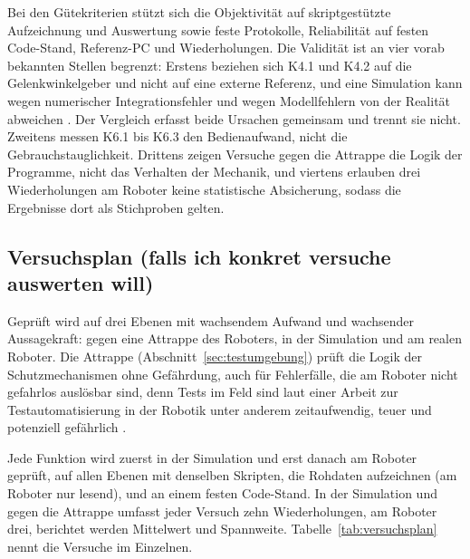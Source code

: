 Bei den Gütekriterien stützt sich die Objektivität auf skriptgestützte Aufzeichnung und Auswertung sowie feste Protokolle, Reliabilität auf festen Code-Stand, Referenz-PC und Wiederholungen.
Die Validität ist an vier vorab bekannten Stellen begrenzt: Erstens beziehen sich K4.1 und K4.2 auf die Gelenkwinkelgeber und nicht auf eine externe Referenz, und eine Simulation kann wegen numerischer Integrationsfehler und wegen Modellfehlern von der Realität abweichen \cite{Erez2015}. Der Vergleich erfasst beide Ursachen gemeinsam und trennt sie nicht.
Zweitens messen K6.1 bis K6.3 den Bedienaufwand, nicht die Gebrauchstauglichkeit. Drittens zeigen Versuche gegen die Attrappe die Logik der Programme, nicht das Verhalten der Mechanik, und viertens erlauben drei Wiederholungen am Roboter keine statistische Absicherung, sodass die Ergebnisse dort als Stichproben gelten.

\subsection{Versuchsplan (falls ich konkret versuche auswerten will)}
\label{sec:versuchsplan}
Geprüft wird auf drei Ebenen mit wachsendem Aufwand und wachsender Aussagekraft: gegen eine Attrappe des Roboters, in der Simulation und am realen Roboter.
Die Attrappe (Abschnitt~\ref{sec:testumgebung}) prüft die Logik der Schutzmechanismen ohne Gefährdung, auch für Fehlerfälle, die am Roboter nicht gefahrlos auslösbar sind, denn Tests im Feld sind laut einer Arbeit zur Testautomatisierung in der Robotik unter anderem zeitaufwendig, teuer und potenziell gefährlich \cite{Afzal2021}.

Jede Funktion wird zuerst in der Simulation und erst danach am Roboter geprüft, auf allen Ebenen mit denselben Skripten, die Rohdaten aufzeichnen (am Roboter nur lesend), und an einem festen Code-Stand.
In der Simulation und gegen die Attrappe umfasst jeder Versuch zehn Wiederholungen, am Roboter drei, berichtet werden Mittelwert und Spannweite.
Tabelle~\ref{tab:versuchsplan} nennt die Versuche im Einzelnen.


